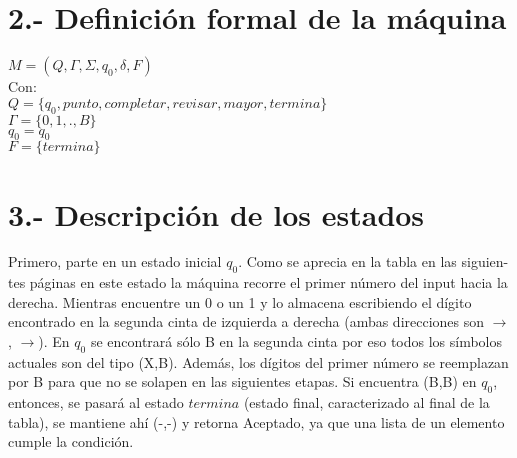 \documentclass[12pt]{article}
\begin{document}
\begin{center}
\end{center}

\pagebreak


\section*{\small 2.- Definición formal de la máquina}


$M=(Q,\Gamma,\Sigma,q_{0},\delta,F)$\\
 
Con:\\

$Q=\{q_{0}, punto, completar, revisar, mayor, termina\}$ \\
$\Gamma=\{0,1,.,B\}$ \\
$q_{0}=q_{0}$ \\
$F=\{termina\}$ \\

\vspace{2ex}


\section*{\small 3.- Descripción de los estados}

 Primero, parte en un estado inicial $q_{0}$. Como se aprecia en la tabla en las siguien-tes páginas en este estado la máquina recorre el primer número del input hacia la derecha. Mientras encuentre un 0 o un 1 y lo almacena escribiendo el dígito encontrado en la segunda cinta de izquierda a derecha (ambas direcciones son $\rightarrow$, $\rightarrow$). En $q_{0}$ se encontrará sólo B en la segunda cinta por eso todos los símbolos actuales son del tipo (X,B). Además, los dígitos del primer número se reemplazan por B para que no se solapen en las siguientes etapas. Si encuentra (B,B) en $q_{0}$, entonces, se pasará al estado $termina$ (estado final, caracterizado al final de la tabla), se mantiene ahí (-,-) y retorna Aceptado, ya que una lista de un elemento cumple la condición.\\ 
\end{document}
